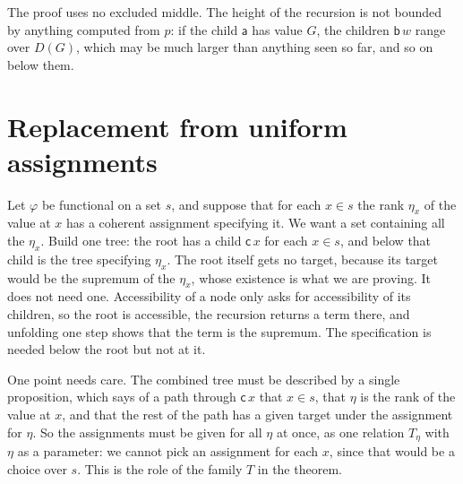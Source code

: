 \documentclass[10pt]{article}
\theoremstyle{definition}
\theoremstyle{remark}
\newcommand{\la}{\mathsf{a}}
\newcommand{\lb}{\mathsf{b}}
\newcommand{\lc}{\mathsf{c}}
\begin{document}
The proof uses no excluded middle. The height of the recursion is not
bounded by anything computed from $p$: if the child $\la$ has value $G$,
the children $\lb\,w$ range over $D(G)$, which may be much larger than
anything seen so far, and so on below them.

\section{Replacement from uniform assignments}\label{sec:repl}

Let $\varphi$ be functional on a set $s$, and suppose that for each $x\in s$ the
rank $\eta_x$ of the value at $x$ has a coherent assignment specifying it. We
want a set containing all the $\eta_x$. Build one tree: the root has a
child $\lc\,x$ for each $x\in s$, and below that child is the tree
specifying $\eta_x$. The root itself gets no target, because its target
would be the supremum of the $\eta_x$, whose existence is what we are
proving. It does not need one. Accessibility of a node only asks for
accessibility of its children, so the root is accessible, the recursion
returns a term there, and unfolding one step shows that the term is the
supremum. The specification is needed below the root but not at it.

One point needs care. The combined tree must be described by a single
proposition, which says of a path through $\lc\,x$ that $x\in s$, that $\eta$ is
the rank of the value at $x$, and that the rest of the path has a given
target under the assignment for $\eta$. So the assignments must be given
for all $\eta$ at once, as one relation $T_\eta$ with $\eta$ as a parameter: we
cannot pick an assignment for each $x$, since that would be a choice
over $s$. This is the role of the family $T$ in the theorem.
\end{document}
